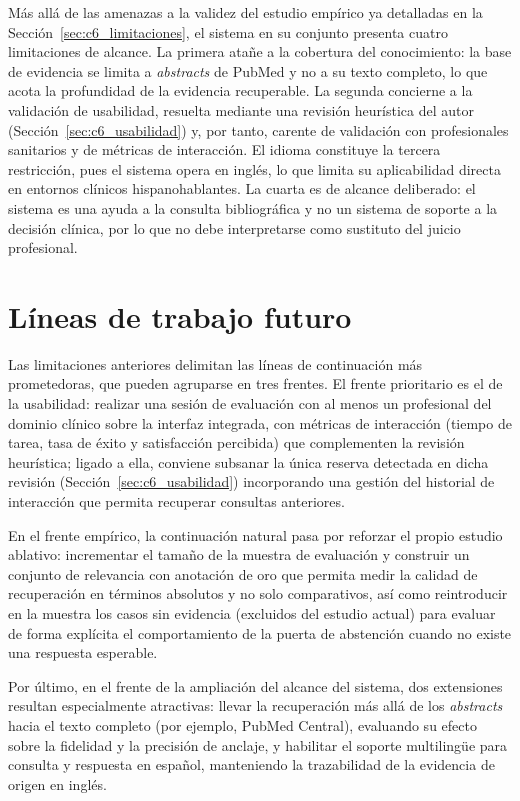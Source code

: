\documentclass[11pt,a4paper,spanish]{book}
\numberwithin{equation}{chapter}
\numberwithin{figure}{chapter}
\begin{document}
Más allá de las amenazas a la validez del estudio empírico ya detalladas en la Sección~\ref{sec:c6_limitaciones}, el sistema en su conjunto presenta cuatro limitaciones de alcance. La primera atañe a la cobertura del conocimiento: la base de evidencia se limita a \textit{abstracts} de PubMed y no a su texto completo, lo que acota la profundidad de la evidencia recuperable. La segunda concierne a la validación de usabilidad, resuelta mediante una revisión heurística del autor (Sección~\ref{sec:c6_usabilidad}) y, por tanto, carente de validación con profesionales sanitarios y de métricas de interacción. El idioma constituye la tercera restricción, pues el sistema opera en inglés, lo que limita su aplicabilidad directa en entornos clínicos hispanohablantes. La cuarta es de alcance deliberado: el sistema es una ayuda a la consulta bibliográfica y no un sistema de soporte a la decisión clínica, por lo que no debe interpretarse como sustituto del juicio profesional.

\section{Líneas de trabajo futuro}
\label{sec:c7_futuro}

Las limitaciones anteriores delimitan las líneas de continuación más prometedoras, que pueden agruparse en tres frentes. El frente prioritario es el de la usabilidad: realizar una sesión de evaluación con al menos un profesional del dominio clínico sobre la interfaz integrada, con métricas de interacción (tiempo de tarea, tasa de éxito y satisfacción percibida) que complementen la revisión heurística; ligado a ella, conviene subsanar la única reserva detectada en dicha revisión (Sección~\ref{sec:c6_usabilidad}) incorporando una gestión del historial de interacción que permita recuperar consultas anteriores.

En el frente empírico, la continuación natural pasa por reforzar el propio estudio ablativo: incrementar el tamaño de la muestra de evaluación y construir un conjunto de relevancia con anotación de oro que permita medir la calidad de recuperación en términos absolutos y no solo comparativos, así como reintroducir en la muestra los casos sin evidencia (excluidos del estudio actual) para evaluar de forma explícita el comportamiento de la puerta de abstención cuando no existe una respuesta esperable.

Por último, en el frente de la ampliación del alcance del sistema, dos extensiones resultan especialmente atractivas: llevar la recuperación más allá de los \textit{abstracts} hacia el texto completo (por ejemplo, PubMed Central), evaluando su efecto sobre la fidelidad y la precisión de anclaje, y habilitar el soporte multilingüe para consulta y respuesta en español, manteniendo la trazabilidad de la evidencia de origen en inglés.
\end{document}
